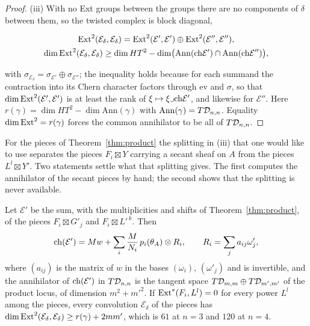 \begin{proof}
(iii) With no Ext groups between the groups there are no components of $\delta$ between them, so the twisted complex is block diagonal,
\begin{widetext}
\begin{equation}\label{eq:blockdiag}
\begin{gathered}
\mathrm{Ext}^{2}(\mathcal{E}_{\delta},\mathcal{E}_{\delta})=\mathrm{Ext}^{2}(\mathcal{E}',\mathcal{E}')\oplus\mathrm{Ext}^{2}(\mathcal{E}'',\mathcal{E}''),\\
\dim\mathrm{Ext}^{2}(\mathcal{E}_{\delta},\mathcal{E}_{\delta})\ge\dim HT^{2}-\dim\bigl(\mathrm{Ann}(\mathrm{ch}\mathcal{E}')\cap\mathrm{Ann}(\mathrm{ch}\mathcal{E}'')\bigr),
\end{gathered}
\end{equation}
\end{widetext}
with $\sigma_{\mathcal{E}_{\delta}}=\sigma_{\mathcal{E}'}\oplus\sigma_{\mathcal{E}''}$; the inequality holds because for each summand the contraction into its Chern character factors through $\mathrm{ev}$ and $\sigma$, so that $\dim\mathrm{Ext}^{2}(\mathcal{E}',\mathcal{E}')$ is at least the rank of $\xi\mapsto\xi\lrcorner\mathrm{ch}\mathcal{E}'$, and likewise for $\mathcal{E}''$. Here $r(\gamma)=\dim HT^{2}-\dim\mathrm{Ann}(\gamma)$ with $\mathrm{Ann}(\gamma)=T\mathcal{D}_{n,n}$. Equality $\dim\mathrm{Ext}^{2}=r(\gamma)$ forces the common annihilator to be all of $T\mathcal{D}_{n,n}$.
\end{proof}

For the pieces of Theorem~\ref{thm:product} the splitting in (iii) that one would like to use separates the pieces $F_{i}\boxtimes Y$ carrying a secant sheaf on $A$ from the pieces $L^{l}\boxtimes Y'$. Two statements settle what that splitting gives. The first computes the annihilator of the secant pieces by hand; the second shows that the splitting is never available.

\begin{theorem}\label{thm:annihilator}
Let $\mathcal{E}'$ be the sum, with the multiplicities and shifts of Theorem~\ref{thm:product}, of the pieces $F_{i}\boxtimes G'_{j}$ and $F_{i}\boxtimes L'^{\,k}$. Then
\begin{equation}\label{eq:chEprime}
\mathrm{ch}(\mathcal{E}')=Mw+\sum_{i}\frac{M}{N_{i}}\,p_{i}(\theta_{A})\otimes R_{i},\qquad R_{i}=\sum_{j}a_{ij}\omega'_{j},
\end{equation}
where $(a_{ij})$ is the matrix of $w$ in the bases $(\omega_{i})$, $(\omega'_{j})$ and is invertible, and the annihilator of $\mathrm{ch}(\mathcal{E}')$ in $T\mathcal{D}_{n,n}$ is the tangent space $T\mathcal{D}_{m,m}\oplus T\mathcal{D}_{m',m'}$ of the product locus, of dimension $m^{2}+m'^{2}$. If $\mathrm{Ext}^{*}(F_{i},L^{l})=0$ for every power $L^{l}$ among the pieces, every convolution $\mathcal{E}_{\delta}$ of the pieces has $\dim\mathrm{Ext}^{2}(\mathcal{E}_{\delta},\mathcal{E}_{\delta})\ge r(\gamma)+2mm'$, which is $61$ at $n=3$ and $120$ at $n=4$.
\end{theorem}

